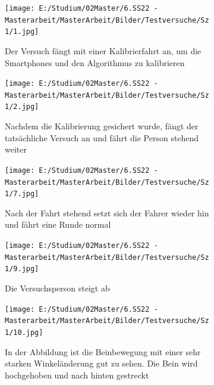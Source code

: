 \begin{figure}[htpb]
	\centering
	\begin{subfigure}{0.35\textwidth}
		\centering
		\texttt{[image: E:/Studium/02Master/6.SS22 - Masterarbeit/MasterArbeit/Bilder/Testversuche/Sz 1/1.jpg]}
	\end{subfigure}
	\begin{subfigure}{0.5\textwidth}
		Der Versuch fängt mit einer Kalibrierfahrt an, um die Smartphones und den Algorithmus zu kalibrieren\\[+0.5em]
	\end{subfigure}
	\begin{subfigure}{0.35\textwidth}
		\centering
		\texttt{[image: E:/Studium/02Master/6.SS22 - Masterarbeit/MasterArbeit/Bilder/Testversuche/Sz 1/2.jpg]}
	\end{subfigure}
	\begin{subfigure}{0.5\textwidth}
		Nachdem die Kalibrierung gesichert wurde, fängt der tatsächliche Versuch an und fährt die Person stehend weiter\\[+0.5em]
	\end{subfigure}
	\begin{subfigure}{0.35\textwidth}
		\centering
		\texttt{[image: E:/Studium/02Master/6.SS22 - Masterarbeit/MasterArbeit/Bilder/Testversuche/Sz 1/7.jpg]}
	\end{subfigure}
	\begin{subfigure}{0.5\textwidth}
		Nach der Fahrt stehend setzt sich der Fahrer wieder hin und fährt eine Runde normal\\[+1em]
	\end{subfigure}
	\begin{subfigure}{0.35\textwidth}
		\centering
		\texttt{[image: E:/Studium/02Master/6.SS22 - Masterarbeit/MasterArbeit/Bilder/Testversuche/Sz 1/9.jpg]}
	\end{subfigure}
	\begin{subfigure}{0.5\textwidth}
		Die Versuchsperson steigt ab\\[+1.5em]
	\end{subfigure}
	\begin{subfigure}{0.35\textwidth}
		\centering
		\texttt{[image: E:/Studium/02Master/6.SS22 - Masterarbeit/MasterArbeit/Bilder/Testversuche/Sz 1/10.jpg]}
	\end{subfigure}
	\begin{subfigure}{0.5\textwidth}
		In der Abbildung ist die Beinbewegung mit einer sehr starken Winkeländerung gut zu sehen. Die Bein wird hochgehoben und nach hinten gestreckt\\[-0.2em]

\end{subfigure}
\end{figure}
